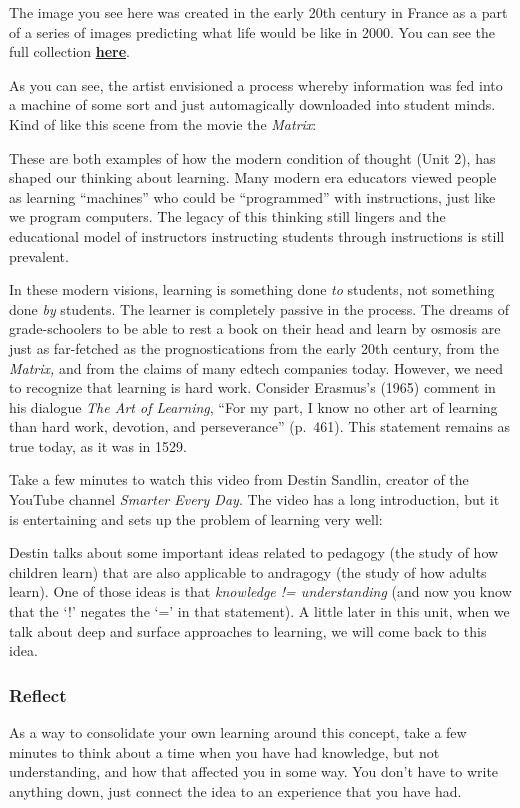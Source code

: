 \documentclass[
]{book}
\begin{document}
The image you see here was created in the early 20th century in France as a part of a series of images predicting what life would be like in 2000. You can see the full collection \href{https://publicdomainreview.org/collections/france-in-the-year-2000-1899-1910/}{\textbf{here}}.

As you can see, the artist envisioned a process whereby information was fed into a machine of some sort and just automagically downloaded into student minds. Kind of like this scene from the movie the \emph{Matrix}:

These are both examples of how the modern condition of thought (Unit 2), has shaped our thinking about learning. Many modern era educators viewed people as learning ``machines'' who could be ``programmed'' with instructions, just like we program computers. The legacy of this thinking still lingers and the educational model of instructors instructing students through instructions is still prevalent.

In these modern visions, learning is something done \emph{to} students, not something done \emph{by} students. The learner is completely passive in the process. The dreams of grade-schoolers to be able to rest a book on their head and learn by osmosis are just as far-fetched as the prognostications from the early 20th century, from the \emph{Matrix,} and from the claims of many edtech companies today. However, we need to recognize that learning is hard work. Consider Erasmus's (1965) comment in his dialogue \emph{The Art of Learning}, ``For my part, I know no other art of learning than hard work, devotion, and perseverance'' (p.~461). This statement remains as true today, as it was in 1529.

Take a few minutes to watch this video from Destin Sandlin, creator of the YouTube channel \emph{Smarter Every Day}. The video has a long introduction, but it is entertaining and sets up the problem of learning very well:

Destin talks about some important ideas related to pedagogy (the study of how children learn) that are also applicable to andragogy (the study of how adults learn). One of those ideas is that \emph{knowledge != understanding} (and now you know that the `!' negates the `=' in that statement). A little later in this unit, when we talk about deep and surface approaches to learning, we will come back to this idea.

\begin{reflect}
\hypertarget{reflect}{%
\subsubsection*{Reflect}\label{reflect}}

As a way to consolidate your own learning around this concept, take a few minutes to think about a time when you have had knowledge, but not understanding, and how that affected you in some way. You don't have to write anything down, just connect the idea to an experience that you have had.
\end{reflect}
\end{document}
